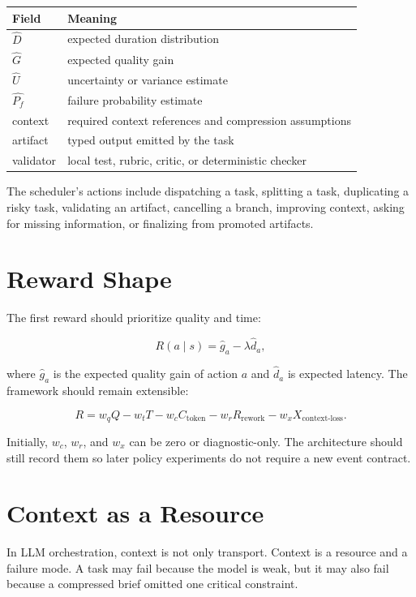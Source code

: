 \documentclass[11pt]{article}
\begin{document}
\begin{center}
\begin{tabular}{ll}
\toprule
Field & Meaning \\
\midrule
$\widehat{D}$ & expected duration distribution \\
$\widehat{G}$ & expected quality gain \\
$\widehat{U}$ & uncertainty or variance estimate \\
$\widehat{P_f}$ & failure probability estimate \\
context & required context references and compression assumptions \\
artifact & typed output emitted by the task \\
validator & local test, rubric, critic, or deterministic checker \\
\bottomrule
\end{tabular}
\end{center}

The scheduler's actions include dispatching a task, splitting a task, duplicating a risky task, validating an artifact, cancelling a branch, improving context, asking for missing information, or finalizing from promoted artifacts.

\section{Reward Shape}

The first reward should prioritize quality and time:

\[
R(a \mid s) = \widehat{g}_a - \lambda \widehat{d}_a,
\]

where $\widehat{g}_a$ is the expected quality gain of action $a$ and $\widehat{d}_a$ is expected latency. The framework should remain extensible:

\[
R =
w_q Q
- w_t T
- w_c C_{\text{token}}
- w_r R_{\text{rework}}
- w_x X_{\text{context-loss}}.
\]

Initially, $w_c$, $w_r$, and $w_x$ can be zero or diagnostic-only. The architecture should still record them so later policy experiments do not require a new event contract.

\section{Context as a Resource}

In LLM orchestration, context is not only transport. Context is a resource and a failure mode. A task may fail because the model is weak, but it may also fail because a compressed brief omitted one critical constraint.
\end{document}
